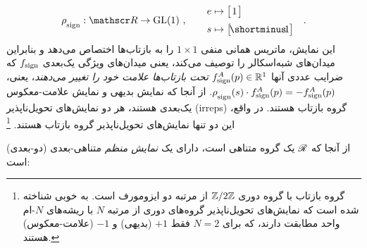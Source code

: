 \begin{align}
	\rhosign: \Flip \to \GL{1}\ , \qquad 
	\begin{aligned}
		e &\mapsto \big[\mkern2mu 1 \mkern2mu\big] \\[2pt]
		s &\mapsto \big[\! \shortminus\!1 \big]
	\end{aligned}
	\quad .
\end{align}
این نمایش، ماتریس همانی منفی {$1\times1$} را به بازتاب‌ها اختصاص می‌دهد و بنابراین میدان‌های شبه‌اسکالر را توصیف می‌کند، یعنی میدان‌های ویژگی یک‌بعدی $f_{\textup{sign}}$ که ضرایب عددی آنها $f^A_{\textup{sign}}(p) \in \mathbb{R}^1$ \emph{تحت بازتاب‌ها علامت خود را تغییر می‌دهند}، یعنی، $\rho_{\overset{}{\textup{sign}}}(s)\cdot f^A_{\textup{sign}}(p) = -f^A_{\textup{sign}}(p)$.
از آنجا که نمایش بدیهی و نمایش علامت-معکوس یک‌بعدی هستند، هر دو نمایش‌های تحویل‌ناپذیر (irreps) گروه بازتاب هستند.
در واقع، این دو تنها نمایش‌های تحویل‌ناپذیر گروه بازتاب هستند.%
\footnote{
	گروه بازتاب با گروه دوری $\mathbb{Z}/2\mathbb{Z}$ از مرتبه دو ایزومورف است.
	به خوبی شناخته شده است که نمایش‌های تحویل‌ناپذیر گروه‌های دوری از مرتبه $N$ با ریشه‌های $N$-ام واحد مطابقت دارند، که برای $N=2$ فقط $+1$ (بدیهی) و $-1$ (علامت-معکوس) هستند.
}

از آنجا که $\mathscr{R}$ یک گروه متناهی است، دارای یک \emph{نمایش منظم} متناهی-بعدی (دو-بعدی) است:

